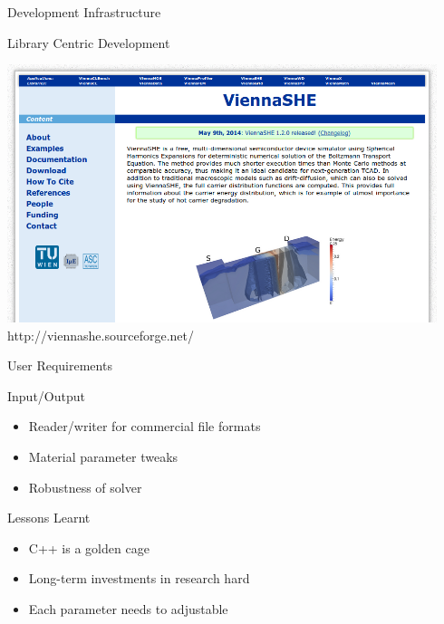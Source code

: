 \documentclass[usepdftitle=false,10pt]{beamer}
\begin{document}
\begin{frame}{Development Infrastructure}
  \begin{block}{Library Centric Development}
   \begin{center}
    \includegraphics[width=0.94\textwidth]{figures/viennashe-web} \\
    http://viennashe.sourceforge.net/
   \end{center}
  \end{block}
\end{frame}


\begin{frame}{User Requirements}

  \begin{block}{Input/Output}
   \begin{itemize}
    \item Reader/writer for commercial file formats
    \item Material parameter tweaks
    \item Robustness of solver
   \end{itemize}
  \end{block}
  
  \begin{block}{Lessons Learnt}
   \begin{itemize}
    \item C++ is a golden cage
    \item Long-term investments in research hard
    \item Each parameter needs to adjustable
   \end{itemize}
  \end{block}
  
\end{frame}
\end{document}
